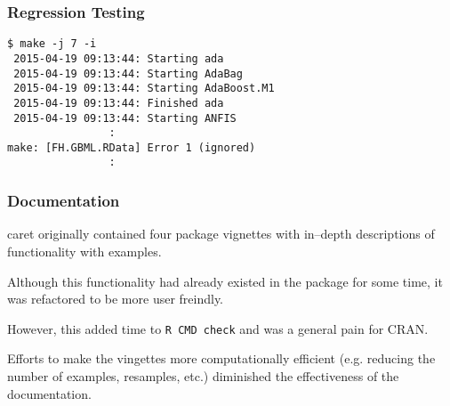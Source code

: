 \documentclass[12 pt]{beamer}\usepackage[]{graphicx}\usepackage[]{color}
\newcommand{\pkg}[1]{{\fontseries{b}\selectfont #1}}
\renewcommand{\pkg}[1]{{\color{darkgreen}\textsf{#1}}}
\begin{document}
  
  \begin{frame}[fragile]
\frametitle{Regression Testing}

\begin{verbatim}
$ make -j 7 -i 
 2015-04-19 09:13:44: Starting ada
 2015-04-19 09:13:44: Starting AdaBag
 2015-04-19 09:13:44: Starting AdaBoost.M1
 2015-04-19 09:13:44: Finished ada
 2015-04-19 09:13:44: Starting ANFIS
                :
make: [FH.GBML.RData] Error 1 (ignored)                
                :

\end{verbatim}

\end{frame}



  
  \begin{frame}[fragile]
\frametitle{Documentation}

\pkg{caret} originally contained four package vignettes with in--depth descriptions of functionality with examples. 

\vspace{.15in}

Although this functionality had already existed in the package for some time, it was refactored to be more user freindly. 

\vspace{.15in}

However, this added time to \texttt{R CMD check} and was a general pain for CRAN.

\vspace{.15in}

Efforts to make the vingettes more computationally efficient (e.g. reducing the number of examples, resamples, etc.) diminished the effectiveness of the documentation.  


\end{frame}

  
\end{document}
